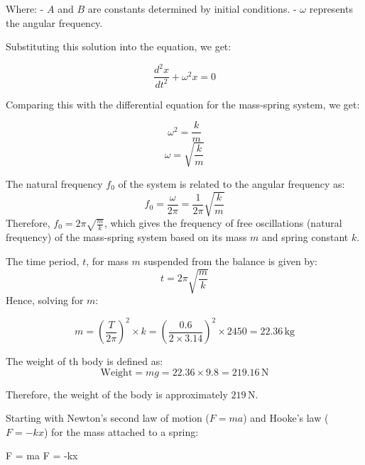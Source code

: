 \documentclass[journal,12pt,twocolumn]{IEEEtran}
\theoremstyle{remark}
\begin{document}
Where:
- $A$ and $B$ are constants determined by initial conditions.
- $\omega$ represents the angular frequency.

Substituting this solution into the equation, we get:

\begin{equation}
\frac{d^2x}{dt^2} + \omega^2x = 0 
\end{equation}



Comparing this with the differential equation for the mass-spring system, we get:

\begin{equation}
\omega^2 = \frac{k}{m} 
\end{equation}
\begin{equation}
 \omega = \sqrt{\frac{k}{m}} 
\end{equation}

The natural frequency $f_0$ of the system is related to the angular frequency as:
\begin{equation}
 f_0 = \frac{\omega}{2\pi} = \frac{1}{2\pi}\sqrt{\frac{k}{m}} 
\end{equation}
Therefore, $f_0 = 2\pi \sqrt{\frac{m}{k}}$, which gives the frequency of free oscillations (natural frequency) of the mass-spring system based on its mass $m$ and spring constant $k$.


The time period, \( t \), for mass \( m \) suspended from the balance is given by:
\begin{equation}
t = 2\pi\sqrt{\frac{m}{k}}
\end{equation}
Hence, solving for \( m \):

\begin{equation}
m = \left(\frac{T}{2\pi}\right)^2 \times k = \left(\frac{0.6}{2 \times 3.14}\right)^2 \times 2450 = 22.36 \, \text{kg}
\end{equation}

The weight of th body is defined as:
\begin{equation}
\text{Weight} = mg = 22.36 \times 9.8 = 219.16 \, \text{N}
\end{equation}

Therefore, the weight of the body is approximately \(219 \, \text{N}\).
	
	\vspace{2cm}

	Starting with Newton's second law of motion ($F = ma$) and Hooke's law ($F = -kx$) for the mass attached to a spring:


     F = ma \quad {} \quad {} F = -kx
\end{document}
